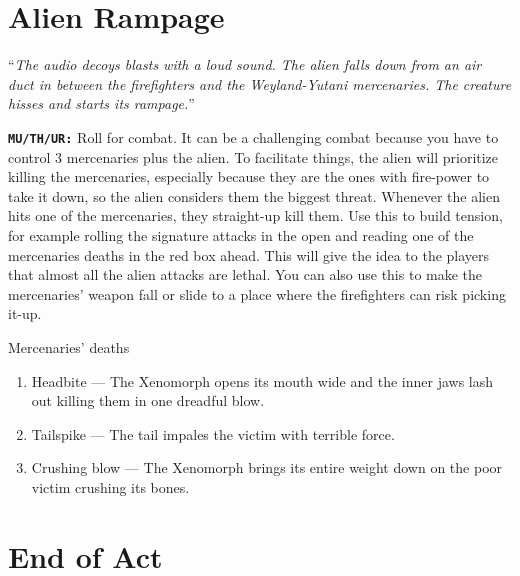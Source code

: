 \section{Alien Rampage}

\begin{rpg-commentbox}{}
    ``\textit{The audio decoys blasts with a loud sound. The alien falls down from an air duct in between the firefighters and the Weyland-Yutani mercenaries. The creature hisses and starts its rampage.}''

    \texttt{\textbf{MU/TH/UR:}} Roll for combat. It can be a challenging combat because you have to control 3 mercenaries plus the alien. To facilitate things, the alien will prioritize killing the mercenaries, especially because they are the ones with fire-power to take it down, so the alien considers them the biggest threat. Whenever the alien hits one of the mercenaries, they straight-up kill them. Use this to build tension, for example rolling the signature attacks in the open and reading one of the mercenaries deaths in the red box ahead. This will give the idea to the players that almost all the alien attacks are lethal. You can also use this to make the mercenaries' weapon fall or slide to a place where the firefighters can risk picking it-up. 
\end{rpg-commentbox}


\begin{rpg-warnbox}{Mercenaries' deaths}
\begin{enumerate}
    \item Headbite --- The Xeno­morph opens its mouth wide and the inner jaws lash out killing them in one dreadful blow.
    \item Tailspike --- The tail impales the victim with terrible force.
    \item Crushing blow --- The Xeno­morph brings its entire weight down on the poor victim crushing its bones.
\end{enumerate}
 \end{rpg-warnbox}


\section{End of Act}

